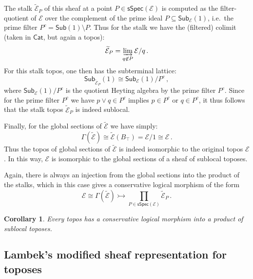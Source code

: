 \documentclass[12pt]{article}
\newcommand{\E}{\ensuremath{\mathcal{E}}}
\newtheorem*{corollary*}{Corollary}
\theoremstyle{remark}
\theoremstyle{definition}
\begin{document}
The stalk $\widetilde{\E}_P$ of this sheaf at a point $P\in \mathsf{sSpec}(\E)$ is computed as the filter-quotient of $\E$ over the complement of the prime ideal $P\subseteq  \mathsf{Sub}_{\E}(1)$, i.e.\ the prime filter $P^c = \mathsf{Sub}(1)\!\setminus\! P$.  Thus for the stalk we have the (filtered) colimit (taken in $\mathsf{Cat}$, but again a topos):
\[
\widetilde{\E}_P = \varinjlim_{q\not\in P} \E/q\,.
\]
For this stalk topos, one then has the subterminal lattice:
\[
\mathsf{Sub}_{\widetilde{\E}_P}(1)\cong \mathsf{Sub}_{\E}(1)/P^c\,,
\]
where $\mathsf{Sub}_{\E}(1)/P^c$ is the quotient Heyting algebra by the prime filter $P^c$.  Since for the prime filter $P^c$ we have $p \vee q \in P^c$ implies $p \in P^c$ or $q \in P^c$, it thus follows that the stalk topos $\widetilde{\E}_P$ is indeed sublocal.


Finally, for the global sections of $\widetilde{\E}$ we  have simply:
$$\Gamma(\widetilde{\E}) \cong \widetilde{\E}(B_\top) = \E/1 \cong \E\,.$$
Thus the topos of global sections of $\widetilde{\E}$ is indeed isomorphic to the original topos $\E$.  In this way, $\E$ is isomorphic to the global sections of a sheaf of sublocal toposes.
\medskip

Again, there is always an injection from the global sections into the product of the stalks, which in this case gives a conservative logical morphism of the form
\[
\E \cong \Gamma(\widetilde{\E}) \rightarrowtail \prod_{P\in \mathsf{sSpec}(\E)}\!\widetilde{\E}_P\,.
\]

\begin{corollary*}\label{cor:SDPtopos}
Every topos has a conservative logical morphism into a product of sublocal toposes.
\end{corollary*}

\subsection{Lambek's modified sheaf representation for toposes}
\end{document}
